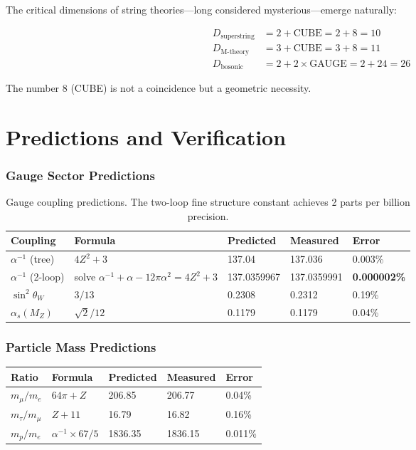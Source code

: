 \documentclass[11pt,a4paper]{article}
\theoremstyle{plain}
\theoremstyle{definition}
\theoremstyle{remark}
\newcommand{\MZ}{M_Z}
\newcommand{\alphas}{\alpha_s}
\newcommand{\thetaW}{\theta_W}
\newcommand{\CUBE}{\text{CUBE}}
\newcommand{\GAUGE}{\text{GAUGE}}
\begin{document}
The critical dimensions of string theories---long considered mysterious---emerge naturally:

\begin{align}
D_{\text{superstring}} &= 2 + \CUBE = 2 + 8 = 10 \\
D_{\text{M-theory}} &= 3 + \CUBE = 3 + 8 = 11 \\
D_{\text{bosonic}} &= 2 + 2 \times \GAUGE = 2 + 24 = 26
\end{align}

The number 8 (CUBE) is not a coincidence but a geometric necessity.

\part{Predictions and Verification}

\section{Gauge Sector Predictions}

\begin{table}[h!]
\centering
\begin{tabular}{lllll}
\toprule
\textbf{Coupling} & \textbf{Formula} & \textbf{Predicted} & \textbf{Measured} & \textbf{Error} \\
\midrule
$\alpha^{-1}$ (tree) & $4Z^2 + 3$ & 137.04 & 137.036 & 0.003\% \\
$\alpha^{-1}$ (2-loop) & solve $\alpha^{-1} + \alpha - 12\pi\alpha^2 = 4Z^2 + 3$ & 137.0359967 & 137.0359991 & \textbf{0.000002\%} \\
$\sin^2\thetaW$ & $3/13$ & 0.2308 & 0.2312 & 0.19\% \\
$\alphas(\MZ)$ & $\sqrt{2}/12$ & 0.1179 & 0.1179 & 0.04\% \\
\bottomrule
\end{tabular}
\caption{Gauge coupling predictions. The two-loop fine structure constant achieves 2 parts per billion precision.}
\end{table}

\section{Particle Mass Predictions}

\begin{table}[h!]
\centering
\begin{tabular}{lllll}
\toprule
\textbf{Ratio} & \textbf{Formula} & \textbf{Predicted} & \textbf{Measured} & \textbf{Error} \\
\midrule
$m_\mu/m_e$ & $64\pi + Z$ & 206.85 & 206.77 & 0.04\% \\
$m_\tau/m_\mu$ & $Z + 11$ & 16.79 & 16.82 & 0.16\% \\
$m_p/m_e$ & $\alpha^{-1} \times 67/5$ & 1836.35 & 1836.15 & 0.011\% \\
\bottomrule
\end{tabular}
\end{table}
\end{document}
